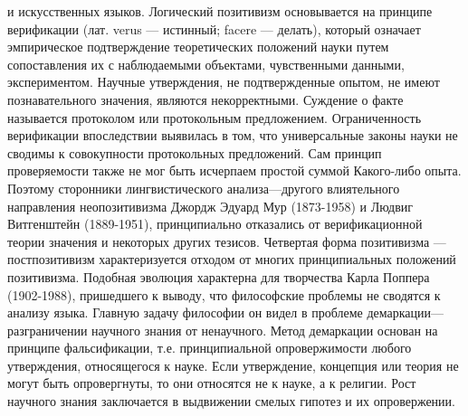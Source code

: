 \documentclass[12pt]{article}
\begin{document}
и  искусственных  языков.  Логический  позитивизм  основывается  на  принципе  верификации  (лат.  verus  —
истинный; facere — делать), который означает эмпирическое подтверждение теоретических положений науки
путем  сопоставления  их  с  наблюдаемыми  объектами,  чувственными  данными,  экспериментом.  Научные
утверждения,  не  подтвержденные  опытом,  не  имеют  познавательного  значения,  являются  некорректными. 
Суждение о факте называется протоколом или протокольным предложением. Ограниченность верификации
впоследствии выявилась в том, что универсальные законы науки не сводимы к совокупности протокольных
предложений. Сам принцип проверяемости также не мог быть исчерпаем простой суммой Какого-либо опыта.
Поэтому сторонники лингвистического анализа—другого влиятельного направления неопозитивизма Джордж
Эдуард Мур (1873-1958) и Людвиг Витгенштейн (1889-1951), принципиально отказались от верификационной
теории значения и некоторых других тезисов.
Четвертая  форма  позитивизма  —  постпозитивизм  характеризуется  отходом  от  многих  принципиальных
положений  позитивизма.  Подобная  эволюция  характерна  для  творчества  Карла  Поппера  (1902-1988),
пришедшего к выводу, что философские проблемы не сводятся к анализу языка. Главную задачу философии он
видел в проблеме демаркации— разграничении научного знания от ненаучного. Метод демаркации основан на
принципе фальсификации, т.е. принципиальной опровержимости любого утверждения, относящегося к науке.
Если утверждение, концепция или теория не могут быть опровергнуты, то они относятся не к науке, а к
религии. Рост научного знания заключается в выдвижении смелых гипотез и их опровержении.


\newpage
\end{document}
